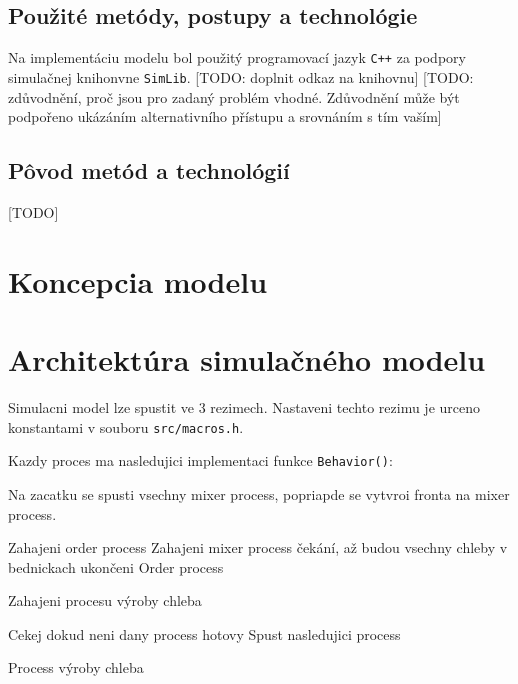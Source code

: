 \documentclass[a4paper, 10pt]{article}
\begin{document}
    \subsection{Použité metódy, postupy a technológie}
    Na implementáciu modelu bol použitý programovací jazyk \texttt{C++} za podpory simulačnej knihonvne \texttt{SimLib}.
    [TODO: doplnit odkaz na knihovnu] [TODO: zdůvodnění, proč jsou pro zadaný problém vhodné. Zdůvodnění může být podpořeno ukázáním alternativního přístupu a srovnáním s tím vaším]
    \subsection{Pôvod metód a technológií}
    [TODO]

    \section {Koncepcia modelu}


    \section{Architektúra simulačného modelu}
    Simulacni model\cite[slide 44]{IMS_slides} lze spustit ve 3 rezimech. Nastaveni techto
    rezimu je urceno konstantami v souboru \texttt{src/macros.h}.

    Kazdy proces ma nasledujici implementaci funkce \texttt{Behavior()}:

    Na zacatku se spusti vsechny mixer process, popriapde se vytvroi fronta na mixer process.
    \begin{algorithm}[ht]

        Zahajeni order process\;
        {
            Zahajeni mixer process\;
        }
        čekání, až budou vsechny chleby v bednickach\;
        ukončeni Order process\;

        \caption{Zahajeni procesu výroby chleba}
        \label{algorithm:orderprocess}
    \end{algorithm}

    \begin{algorithm}[ht]
        Cekej dokud neni dany process hotovy\;
        Spust nasledujici process\;
        \caption{Process výroby chleba}
        \label{algorithm:otherprocess}
    \end{algorithm}
\end{document}
